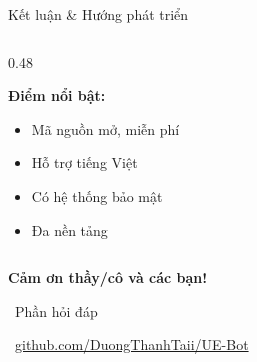 \documentclass[aspectratio=169,12pt]{beamer}
\begin{document}
\begin{frame}{Kết luận \& Hướng phát triển}
\begin{columns}[T]
\begin{column}{0.48\textwidth}
            \vspace{0.5cm}

            \textbf{\color{primaryblue} Điểm nổi bật:}
            \begin{itemize}
                \item Mã nguồn mở, miễn phí
                \item Hỗ trợ tiếng Việt
                \item Có hệ thống bảo mật
                \item Đa nền tảng
            \end{itemize}
        \end{column}
    \end{columns}
\end{frame}

\begin{frame}[plain]
    \begin{center}
        \vspace{2cm}
        {\Huge\bfseries\color{primaryblue} Cảm ơn thầy/cô và các bạn!}

        \vspace{1.5cm}

        {\Large{}~Phần hỏi đáp}

        \vspace{1.5cm}

        {\large
            ~\url{github.com/DuongThanhTaii/UE-Bot}
        }
    \end{center}
\end{frame}
\end{document}
